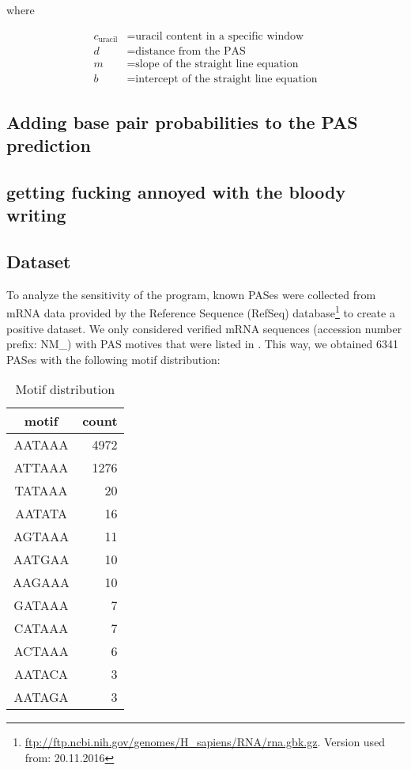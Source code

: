 where

\begin{equation*}
  \begin{aligned}
	  c_{\text{uracil}} &= \text{uracil content in a specific window} \\
	  d &= \text{distance from the PAS} \\
	  m &= \text{slope of the straight line equation} \\
	  b &= \text{intercept of the straight line equation} 
  \end{aligned}
\end{equation*}

\subsection{Adding base pair probabilities to the PAS prediction}


\subsection{getting fucking annoyed with the bloody writing}


\subsection{Dataset}
To analyze the sensitivity of the program, known PASes were collected from mRNA data provided by the Reference Sequence (RefSeq) database\footnote{\url{ftp://ftp.ncbi.nih.gov/genomes/H_sapiens/RNA/rna.gbk.gz}. Version used from: 20.11.2016} to create a positive dataset. We only considered verified mRNA sequences (accession number prefix: NM\_) with PAS motives that were listed in \citeauthor{pmid19393560}. This way, we obtained 6341 PASes with the following motif distribution:

\begin{table}[!h]
\centering
  \begin{tabular}{c|r}
	motif & count \\
	\hline
	AATAAA & 4972 \\
	ATTAAA & 1276 \\
	TATAAA & 20 \\
	AATATA & 16 \\
	AGTAAA & 11 \\
	AATGAA & 10 \\
	AAGAAA & 10 \\
	GATAAA & 7 \\
	CATAAA & 7 \\
	ACTAAA & 6 \\
	AATACA & 3 \\
	AATAGA & 3 \\
  \end{tabular}
\caption{Motif distribution}
\label{motif_dist}
\end{table}

